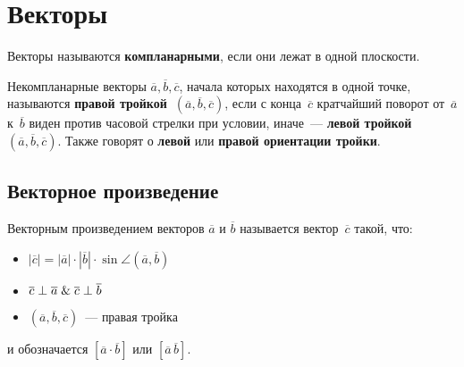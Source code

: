 \section{Векторы}
 Векторы называются \textbf{компланарными}, если они лежат в одной плоскости.

Некомпланарные векторы $\overline a, \overline b, \overline c$, начала которых находятся в одной точке, называются \textbf{правой тройкой~$(\overline a, \overline b, \overline c)$}, если с конца~$\overline c$ кратчайший поворот от~$\overline a$ к~$\overline b$ виден против часовой стрелки при условии, иначе~--- \textbf{левой тройкой~$(\overline a, \overline b, \overline c)$}.
Также говорят о \textbf{левой} или \textbf{правой ориентации тройки}.

\subsection{Векторное произведение}
 Векторным произведением векторов $\overline a$ и $\overline b$ называется вектор~$\overline c$ такой, что:
\begin{itemize}
	\item $|\overline c| = |\overline a| \cdot |\overline b| \cdot \sin \angle(\overline a, \overline b)$
	\item $\overline c \perp \overline a \mathrel{\&} \overline c \perp \overline b$
	\item $(\overline a, \overline b, \overline c)$~--- правая тройка
\end{itemize}
и обозначается $[\overline a \cdot \overline b]$ или $[\overline a\,\overline b]$.

